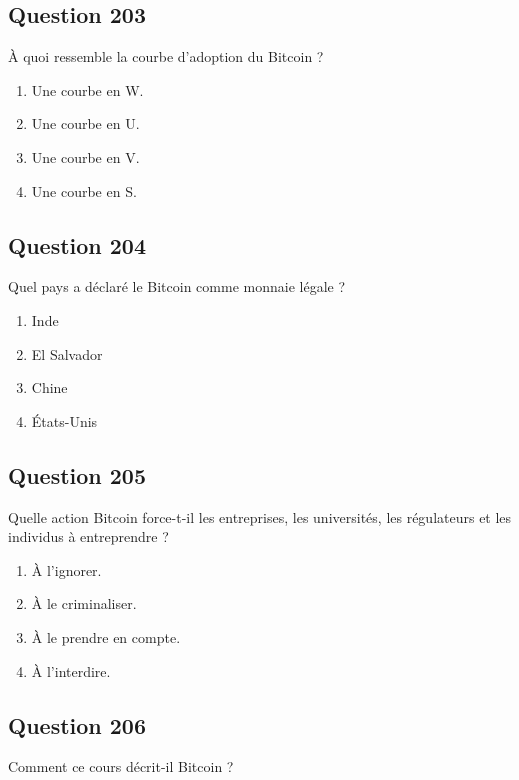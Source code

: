 \documentclass[12pt,a4paper]{article}
\begin{document}
\bigskip


\subsection*{Question 203}
À quoi ressemble la courbe d'adoption du Bitcoin ?

\begin{enumerate}[label=\Alph*., leftmargin=*]
\item Une courbe en W.
\item Une courbe en U.
\item Une courbe en V.
\item Une courbe en S.
\end{enumerate}

\bigskip


\subsection*{Question 204}
Quel pays a déclaré le Bitcoin comme monnaie légale ?

\begin{enumerate}[label=\Alph*., leftmargin=*]
\item Inde
\item El Salvador
\item Chine
\item États-Unis
\end{enumerate}

\bigskip


\subsection*{Question 205}
Quelle action Bitcoin force-t-il les entreprises, les universités, les régulateurs et les individus à entreprendre ?

\begin{enumerate}[label=\Alph*., leftmargin=*]
\item À l'ignorer.
\item À le criminaliser.
\item À le prendre en compte.
\item À l'interdire.
\end{enumerate}

\bigskip


\subsection*{Question 206}
Comment ce cours décrit-il Bitcoin ?
\end{document}

